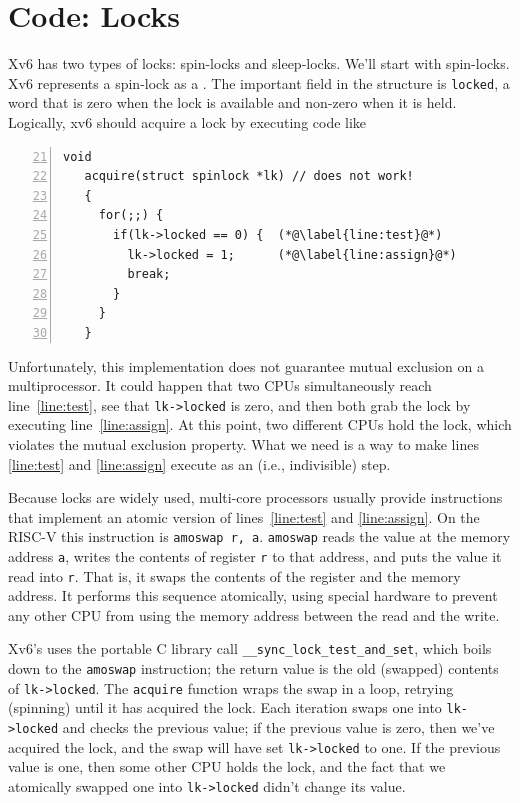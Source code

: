 \section{Code: Locks}
Xv6 has two types of locks: spin-locks and sleep-locks.
We'll start with spin-locks.
Xv6 represents a spin-lock as a
.
The important field in the structure is
\lstinline{locked},
a word that is zero when the lock is available
and non-zero when it is held.
Logically, xv6 should acquire a lock by executing code like
\begin{lstlisting}[numbers=left,firstnumber=21]
   void
   acquire(struct spinlock *lk) // does not work!
   {
     for(;;) {
       if(lk->locked == 0) {  (*@\label{line:test}@*)
         lk->locked = 1;      (*@\label{line:assign}@*)
         break;
       }
     }
   }
\end{lstlisting}
Unfortunately, this implementation does not
guarantee mutual exclusion on a multiprocessor.
It could happen that two CPUs simultaneously
reach line~\ref{line:test}, see that 
\lstinline{lk->locked}
is zero, and then both grab the lock by executing line~\ref{line:assign}.
At this point, two different CPUs hold the lock,
which violates the mutual exclusion property.
What we need is a way to
make lines \ref{line:test} and \ref{line:assign} execute as an
(i.e., indivisible) step.

Because locks are widely used,
multi-core processors usually provide instructions that
implement an atomic version of
lines~\ref{line:test} and \ref{line:assign}.
On the RISC-V this instruction is
\lstinline{amoswap r, a}.
\lstinline{amoswap}
reads the value at the memory address {\tt a},
writes the contents of register {\tt r} to that address,
and puts the value it read into {\tt r}.
That is, it swaps the contents of the register and the memory address.
It performs this sequence atomically, using special
hardware to prevent any
other CPU from using the memory address between the read and the write.

Xv6's 
uses the portable C library call 
\lstinline{__sync_lock_test_and_set},
which boils down to the
\lstinline{amoswap}
instruction;
the return value is the old (swapped) contents of
\lstinline{lk->locked}.
The
\lstinline{acquire}
function wraps the swap in a loop, retrying (spinning) until it has
acquired the lock.
Each iteration swaps one into
\lstinline{lk->locked} 
and checks the previous value;
if the previous value is zero, then we've acquired the
lock, and the swap will have set 
\lstinline{lk->locked}
to one.
If the previous value is one, then some other CPU
holds the lock, and the fact that we atomically swapped one into
\lstinline{lk->locked}
didn't change its value.

